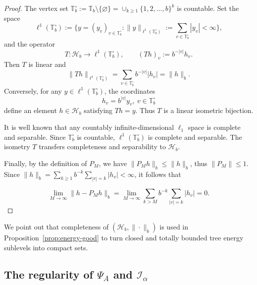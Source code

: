 \documentclass[a4paper, 11pt]{article}
\newcommand{\1}{\mathbf 1}
\theoremstyle{plain}
\begin{document}
\begin{proof}
The vertex set
$
  \mathbb{T}_b^\circ:=\mathbb{T}_b\setminus\{\varnothing\}=\cup_{k\geq1}\{1,2,...,b\}^k
$
is countable. Set the space
\[
  \ell^1(\mathbb{T}_b^\circ)
  :=\Big\{y=(y_v)_{v\in\mathbb{T}_b^\circ}:
    \|y\|_{\ell^1(\mathbb{T}_b^\circ)}:=\sum_{v\in\mathbb{T}_b^\circ}|y_v|<\infty\Big\},
\]
and the operator
\[
  T:\mathcal{H}_b\longrightarrow\ell^1(\mathbb{T}_b^\circ),
  \qquad
  (Th)_v:=b^{-|v|}h_v.
\]
Then \(T\) is linear and
\[
  \|Th\|_{\ell^1(\mathbb{T}_b^\circ)}
  =
  \sum_{v\in\mathbb{T}_b^\circ}b^{-|v|}|h_v|
  =
  \|h\|_b.
\]
Conversely, for any \(y\in\ell^1(\mathbb{T}_b^\circ)\), the coordinates
\[
  h_v=b^{|v|}y_v,~v\in\mathbb{T}_b^\circ
\]
define an element \(h\in\mathcal{H}_b\) satisfying \(Th=y\).  Thus \(T\) is a
linear isometric bijection.
\par
It is well known that any countably infinite-dimensional $\ell_1$ space is complete and separable. Since \(\mathbb{T}_b^\circ\) is countable, \(\ell^1(\mathbb{T}_b^\circ)\) is complete and separable. The isometry \(T\) transfers completeness and separability to
\(\mathcal{H}_b\).

Finally, by the definition of $P_M$, we have $\|P_Mh\|_b\leq\|h\|_b$, thus  \(\|P_M\|\leq1\). Since $\|h\|_b=\sum_{k\geq1}b^{-k}\sum_{|v|=k}|h_v|<\infty$, it follows that

\[
  \lim_{M\to\infty}\|h-P_Mh\|_b
  =
   \lim_{M\to\infty}\sum_{k>M}b^{-k}\sum_{|v|=k}|h_v|
  =0.
\]

\end{proof}
\par
We point out that completeness of \((\mathcal{H}_b,\|\cdot\|_b)\) is used in Proposition~\ref{prop:energy-good} to turn closed
and totally bounded tree energy sublevels into compact sets.


\subsection{The regularity of $\Psi_A$ and $\mathcal{I_{\alpha}}$}\label{rfvgrte6yr4}
\end{document}
